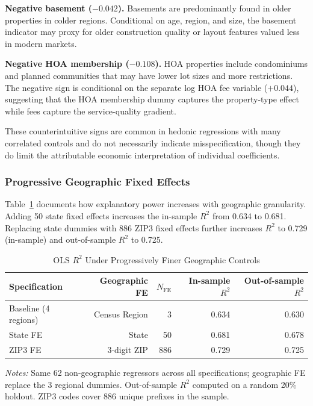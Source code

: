 \textbf{Negative basement ($-0.042$).} Basements are predominantly found in older properties in colder regions. Conditional on age, region, and size, the basement indicator may proxy for older construction quality or layout features valued less in modern markets.

\textbf{Negative HOA membership ($-0.108$).} HOA properties include condominiums and planned communities that may have lower lot sizes and more restrictions. The negative sign is conditional on the separate log HOA fee variable ($+0.044$), suggesting that the HOA membership dummy captures the property-type effect while fees capture the service-quality gradient.

These counterintuitive signs are common in hedonic regressions with many correlated controls and do not necessarily indicate misspecification, though they do limit the attributable economic interpretation of individual coefficients.

\subsubsection{Progressive Geographic Fixed Effects}
\label{sec:progressive_fe}

Table~\ref{tab:fe_comparison} documents how explanatory power increases with geographic granularity. Adding 50 state fixed effects increases the in-sample $R^2$ from 0.634 to 0.681. Replacing state dummies with 886 ZIP3 fixed effects further increases $R^2$ to 0.729 (in-sample) and out-of-sample $R^2$ to 0.725.

\begin{table}[H]
\centering
\caption{OLS $R^2$ Under Progressively Finer Geographic Controls}
\label{tab:fe_comparison}
\begin{threeparttable}
\begin{tabular}{lrrrr}
\toprule
Specification & Geographic FE & $N_{\text{FE}}$ & In-sample $R^2$ & Out-of-sample $R^2$ \\
\midrule
Baseline (4 regions) & Census Region & 3 & 0.634 & 0.630 \\
State FE & State & 50 & 0.681 & 0.678 \\
ZIP3 FE & 3-digit ZIP & 886 & 0.729 & 0.725 \\
\bottomrule
\end{tabular}
\begin{tablenotes}
\small
\item \textit{Notes:} Same 62 non-geographic regressors across all specifications; geographic FE replace the 3 regional dummies. Out-of-sample $R^2$ computed on a random 20\% holdout. ZIP3 codes cover 886 unique prefixes in the sample.
\end{tablenotes}
\end{threeparttable}
\end{table}

